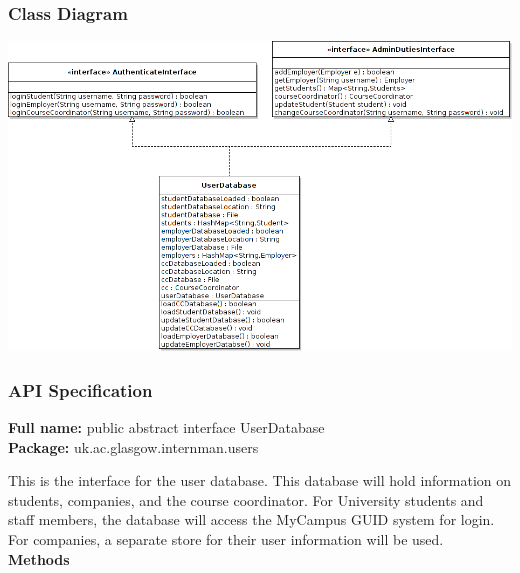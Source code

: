 \documentclass[11pt]{l3deliverable}
\begin{document}
\subsubsection{Class Diagram}

\includegraphics[width=\textwidth]{databaseClassDiagram.png}

\subsubsection{API Specification}

\textbf{Full name:} public abstract interface UserDatabase\\

\textbf{Package:} uk.ac.glasgow.internman.users

This is the interface for the user database. This database will hold information
on students, companies, and the course coordinator. For University students and
staff members, the database will access the MyCampus GUID system for login. For
companies, a separate store for their user information will be used.\\

\textbf{Methods}
\end{document}
